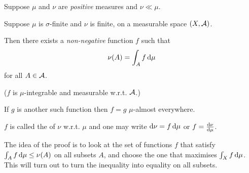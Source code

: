 \begin{theorem}
  Suppose $\mu$ and $\nu$ are {\it positive} measures and $\nu \ll \mu$.

  Suppose $\mu$ is $\sigma$-finite and $\nu$ is finite, on a measurable space $(X, \mathcal A)$.

  Then there exists a {\it non-negative} function $f$ such that
  \begin{align*}
  \nu(A) = \int_A f \d\mu
  \end{align*}
  for all $A \in \mathcal A$.

  ($f$ is $\mu$-integrable and measurable w.r.t. $\mathcal A$.)

  If $g$ is another such function then $f = g$ $\mu$-almost everywhere.

  $f$ is called the  of $\nu$ w.r.t. $\mu$ and one may write
  $\d\nu = f\dmu$ or $f = \frac{\d\nu}{\dmu}$.
\end{theorem}

The idea of the proof is to look at the set of functions $f$ that
satisfy $\int_A f \d\mu \leq \nu(A)$ on all subsets $A$, and choose the one that
maximises $\int_X f \dmu$. This will turn out to turn the inequality into equality on all subsets.


